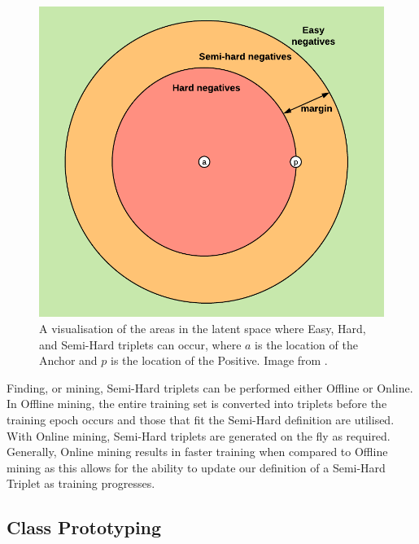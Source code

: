 \begin{figure}
	\begin{center}
		\includegraphics[scale=0.7]{Chapter6/figs/semi-hard-triplet-mining.png}
	\end{center}
	\caption[A visualisation of the areas in the latent space where Easy, Hard, and Semi-Hard triplets can occur.]{A visualisation of the areas in the latent space where Easy, Hard, and Semi-Hard triplets can occur, where $a$ is the location of the Anchor and $p$ is the location of the Positive. Image from \cite{moindrot_triplet_2018}.}
	\label{fig:semi-hard-triplet-mining}
\end{figure}

Finding, or mining, Semi-Hard triplets can be performed either Offline or Online. In Offline mining, the entire training set is converted into triplets before the training epoch occurs and those that fit the Semi-Hard definition are utilised. With Online mining, Semi-Hard triplets are generated on the fly as required. Generally, Online mining results in faster training when compared to Offline mining as this allows for the ability to update our definition of a Semi-Hard Triplet as training progresses.

\subsection{Class Prototyping}\label{ch:ID,sec:SNNBackground,sub:prototypes}

